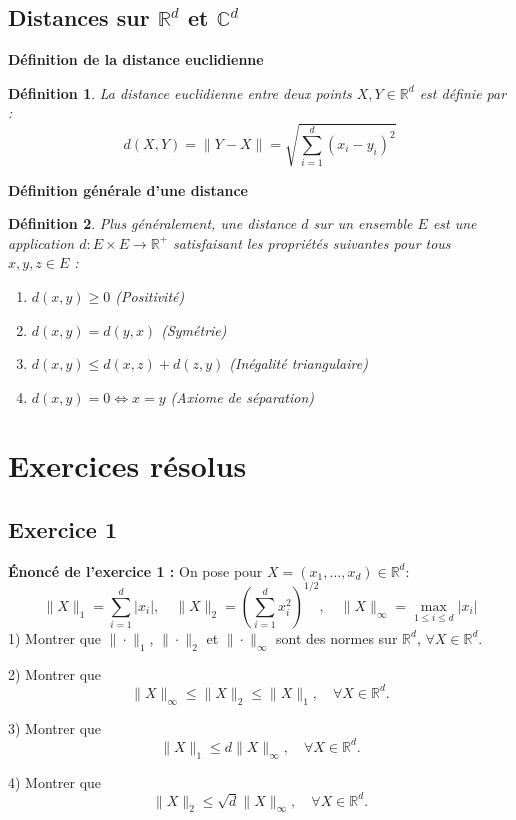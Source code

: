 \documentclass{article}
\newtheorem{definition}{Définition}
\begin{document}
\subsection*{Distances sur $\mathbb{R}^d$ et $\mathbb{C}^d$}

\textbf{Définition de la distance euclidienne}
\begin{definition}
La distance euclidienne entre deux points $X, Y \in \mathbb{R}^d$ est définie par :
\[
d(X, Y) = \|Y - X\| = \sqrt{\sum_{i=1}^d (x_i - y_i)^2}
\]
\end{definition}

\textbf{Définition générale d'une distance}
\begin{definition}
Plus généralement, une distance $d$ sur un ensemble $E$ est une application $d: E \times E \rightarrow \mathbb{R}^+$ satisfaisant les propriétés suivantes pour tous $x, y, z \in E$ :
\begin{enumerate}
    \item $d(x, y) \geq 0$ (Positivité)
    \item $d(x, y) = d(y, x)$ (Symétrie)
    \item $d(x, y) \leq d(x, z) + d(z, y)$ (Inégalité triangulaire)
    \item $d(x, y) = 0 \Leftrightarrow x = y$ (Axiome de séparation)
\end{enumerate}
\end{definition}

\section{Exercices résolus}

\subsection{Exercice 1}

\textbf{Énoncé de l'exercice 1 :}
On pose pour $X = (x_1, \dots, x_d) \in \mathbb{R}^d$:
\[
\|X\|_1 = \sum_{i=1}^d |x_i|, \quad \|X\|_2 = (\sum_{i=1}^d x_i^2)^{1/2}, \quad \|X\|_\infty = \max_{1 \leq i \leq d} |x_i|
\]
1) Montrer que $\|\cdot\|_1$, $\|\cdot\|_2$ et $\|\cdot\|_\infty$ sont des normes sur $\mathbb{R}^d$, $\forall X \in \mathbb{R}^d$.

2) Montrer que
\[
\|X\|_\infty \leq \|X\|_2 \leq \|X\|_1, \quad \forall X \in \mathbb{R}^d.
\]

3) Montrer que
\[
\|X\|_1 \leq d \|X\|_\infty, \quad \forall X \in \mathbb{R}^d.
\]

4) Montrer que
\[
\|X\|_2 \leq \sqrt{d} \|X\|_\infty, \quad \forall X \in \mathbb{R}^d.
\]
\end{document}
